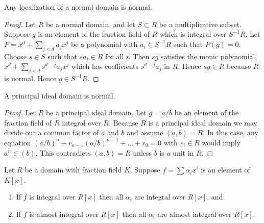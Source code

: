 \begin{lemma}
\label{lemma-localize-normal-domain}
Any localization of a normal domain is normal.
\end{lemma}

\begin{proof}
Let $R$ be a normal domain, and let $S \subset R$ be
a multiplicative subset. Suppose $g$ is an element
of the fraction field of $R$ which is integral over $S^{-1}R$.
Let $P = x^d + \sum_{j < d} a_j x^j$ be a polynomial
with $a_i \in S^{-1}R$ such that $P(g) = 0$.
Choose $s \in S$ such that $sa_i \in R$ for all $i$.
Then $sg$ satisfies the monic polynomial
$x^d + \sum_{j < d} s^{d-j}a_j x^j$ which has coefficients
$s^{d-j}a_j$ in $R$. Hence $sg \in R$ because $R$ is normal.
Hence $g \in S^{-1}R$.
\end{proof}

\begin{lemma}
\label{lemma-PID-normal}
A principal ideal domain is normal.
\end{lemma}

\begin{proof}
Let $R$ be a principal ideal domain.
Let $g = a/b$ be an element of the fraction field
of $R$ integral over $R$. Because $R$ is a principal ideal domain
we may divide out a common factor of $a$ and $b$
and assume $(a, b) = R$. In this case, any equation
$(a/b)^n + r_{n-1} (a/b)^{n-1} + \ldots + r_0 = 0$
with $r_i \in R$ would imply $a^n \in (b)$. This
contradicts $(a, b) = R$ unless $b$ is a unit in $R$.
\end{proof}

\begin{lemma}
\label{lemma-prepare-polynomial-ring-normal}
Let $R$ be a domain with fraction field $K$.
Suppose $f = \sum \alpha_i x^i$ is an
element of $K[x]$.
\begin{enumerate}
\item If $f$ is integral over $R[x]$
then all $\alpha_i$ are integral over $R[x]$, and
\item If $f$ is almost integral over $R[x]$
then all $\alpha_i$ are almost integral over $R[x]$.
\end{enumerate}
\end{lemma}

